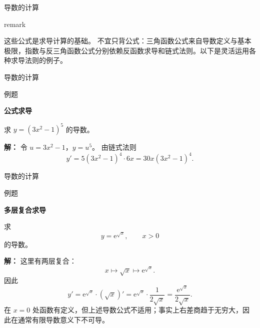 \documentclass[aspectratio=169,10pt,fontset=fandol]{ctexbeamer}
\newcommand{\ee}{\mathrm{e}}
\begin{document}
\begin{frame}[t,fragile]{导数的计算}
\normalsize
{\normalsize
remark

}
{\normalsize
这些公式是求导计算的基础。 不宜只背公式：三角函数公式来自导数定义与基本极限，指数与反三角函数公式分别依赖反函数求导和链式法则。以下是灵活运用各种求导法则的例子。

}
\end{frame}
\begin{frame}[t,fragile]{导数的计算}
\normalsize
\begin{block}{例题}
{\normalsize
\textbf{公式求导}\par

	求 $y=(3x^2-1)^5$ 的导数。

}
\end{block}
\pause
{\normalsize
\textbf{解：}
令 $u=3x^2-1$，$y=u^5$。 由链式法则
	\[
	y'=5(3x^2-1)^4\cdot6x=30x(3x^2-1)^4.
	\]

}
\end{frame}
\begin{frame}[t,fragile]{导数的计算}
\normalsize
\begin{block}{例题}
{\normalsize
\textbf{多层复合求导}\par

	求
	\[
	y=\ee^{\sqrt{x}},\qquad x>0
	\]
	的导数。

}
\end{block}
\pause
{\normalsize
\textbf{解：}
这里有两层复合：
	\[
	x\longmapsto \sqrt{x}\longmapsto \ee^{\sqrt{x}}.
	\]
	因此
	\[
	y'=\ee^{\sqrt{x}}\cdot(\sqrt{x})'
	=\ee^{\sqrt{x}}\cdot\frac{1}{2\sqrt{x}}
	=\frac{\ee^{\sqrt{x}}}{2\sqrt{x}}.
	\]
	在 $x=0$ 处函数有定义，但上述导数公式不适用；事实上右差商趋于无穷大，因此在通常有限导数意义下不可导。

}
\end{frame}
\end{document}
